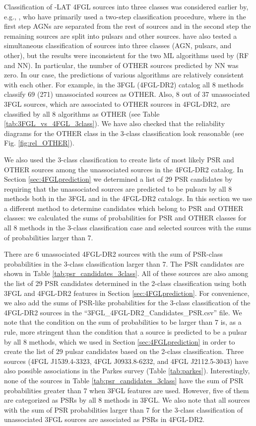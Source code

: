 Classification of \Fermi-LAT 4FGL sources into three classes was considered earlier by, e.g., \cite{2021RAA....21...15Z}, 
who have primarily used a two-step classification procedure, where in the first step AGNs are separated from the rest of sources and in the second step the remaining sources are split into pulsars and other sources.
\cite{2021RAA....21...15Z} have also tested a simultaneous classification of sources into three classes (AGN, pulsars, and other),
but the results were inconsistent for the two ML algorithms used by \cite{2021RAA....21...15Z} (RF and NN).
In particular, the number of OTHER sources predicted by NN was zero.
In our case, the predictions of various algorithms are relatively consistent with each other.
For example, in the 3FGL (4FGL-DR2) catalog all 8 methods classify 69 (271) unassociated sources as OTHER.
Also, 8 out of 37 unassociated 3FGL sources, which are associated to OTHER sources in 4FGL-DR2, are classified by all 8 algorithms as
OTHER (see Table \ref{tab:3FGL_vs_4FGL_3class}).
We have also checked that the reliability diagrams for the OTHER class in the 3-class classification look reasonable
(see Fig. \ref{fig:rel_OTHER}).

We also used the 3-class classification to create lists of most likely PSR and OTHER sources among the unassociated
sources in the 4FGL-DR2 catalog.
In Section \ref{sec:4FGLprediction} we determined a list of 29 PSR candidates by requiring that 
the unassociated sources are predicted to be pulsars by all 8 methods both in the 3FGL and in the 4FGL-DR2 catalogs.
In this section we use a different method to determine candidates which belong to PSR and OTHER classes: 
we calculated the sums of probabilities for PSR and OTHER classes for all 8 methods in the 3-class classification case
and selected sources with the sums of probabilities larger than 7.


There are 6 unassociated 4FGL-DR2 sources
with the sum of PSR-class probabilities in the 3-class classification larger than 7.
The PSR candidates are shown in Table \ref{tab:psr_candidates_3class}. 
All of these sources are also among the list of 29 PSR candidates determined in the 2-class classification using both 3FGL and 4FGL-DR2 
features in Section \ref{sec:4FGLprediction}. 
For convenience, we also add the sums of PSR-like probabilities for the 3-class classification of the 4FGL-DR2 sources
in the ``3FGL\_4FGL-DR2\_Candidates\_PSR.csv'' file.
We note that the condition on the sum of probabilities to be larger than 7 is, as a rule, more stringent than the condition that a source
is predicted to be a pulsar by all 8 methods, which we used in Section \ref{sec:4FGLprediction} in order to create the list of 29 pulsar
candidates based on the 2-class classification.
Three sources (4FGL J1539.4-3323, 4FGL J0933.8-6232,  and 4FGL J2112.5-3043) 
have also possible associations in the Parkes survey (Table \ref{tab:parkes}).
Interestingly, none of the sources in Table \ref{tab:psr_candidates_3class} have the sum of PSR probabilities greater than 7 when 3FGL features are used. However, five of them are categorized as PSRs by all 8 methods in 3FGL. 
We also note that all sources with the sum of PSR probabilities larger than 7 for the 3-class classification of unassociated 3FGL sources
are associated as PSRs in 4FGL-DR2.

